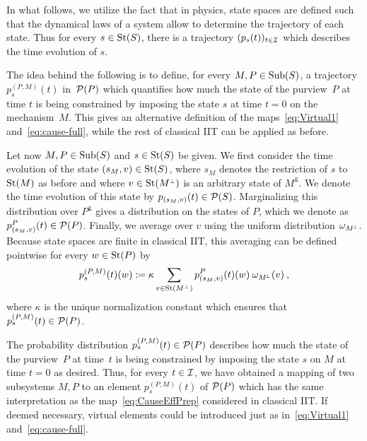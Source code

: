 In what follows, we utilize the fact that in physics, state spaces are defined such that the dynamical laws of a system allow to determine the trajectory of each state.
Thus for every $s \in \text{St}(S)$, there is a trajectory  $(p_s(t))_{t\in{\mathcal{I}}}$ which describes the time evolution of $s$.\medskip


The idea behind the following is to define, for every $M, P \in \mathrm{Sub}(S)$, a trajectory $p_{s}^{(P,M)}\!(t)$ in~$\mathcal P(P)$ which quantifies how much the state of the purview~$P$ at time $t$ is being constrained by imposing the state $s$ at time $t=0$ on the mechanism~$M$. 
This gives an alternative definition of the maps~\eqref{eq:Virtual1} and~\eqref{eq:cause-full}, while the rest of classical IIT can be applied as before.\medskip


Let now $M, P \in \mathrm{Sub}(S)$ and $s \in \text{St}(S)$ be given.
We first consider the time evolution of the state $(s_M, v) \in \text{St}(S)$, where $s_M$ denotes the restriction of $s$ to $\text{St}(M)$ as before and where $v \in \text{St}(M^{\scriptscriptstyle \bot})$ is an arbitrary state of $M^\Bot$. We denote the time evolution of this state by $p_{(s_M,v)}(t) \in \mathcal P(S)$.
Marginalizing this distribution over $P^\Bot$ gives a distribution on the states of $P$, which we denote as $ p_{(s_M,v)}^P(t) \in \mathcal P(P)$.
Finally, we average over $v$ using the uniform distribution ${\omega_{M^{\!\scriptscriptstyle \bot}}}$. Because state spaces are finite in classical IIT, this averaging can be defined pointwise for every $w \in \text{St}(P)$ by
\begin{equation}\label{eq:Average}
p_{s}^{(P,M)}(t)(w) := \kappa  \sum_{v \in \text{St}(M^{\scriptscriptstyle \bot})} p_{(s_M,v)}^P(t)(w) \: {\omega_{M^{\!\scriptscriptstyle \bot}}}(v) \: ,
\end{equation}
where $\kappa$ is the unique normalization constant which ensures that $p_{s}^{(P,M)}(t) \in \mathcal P(P)$.

The probability distribution $p_{s}^{(P,M)}(t) \in \mathcal P(P)$ describes how much the state of the purview~$P$ at time~$t$ is being constrained by imposing the state $s$ on $M$ at time $t=0$ as desired. Thus, for every $t \in {\mathcal{I}}$, we have obtained a mapping of two subsystems $M, P$ to an element $p_{s}^{(P,M)}(t)$ of $\mathcal P(P)$ which has the same interpretation as the map~\eqref{eq:CauseEffPrep} considered in classical IIT.
If deemed necessary, virtual elements could be introduced just as in~\eqref{eq:Virtual1} and~\eqref{eq:cause-full}.
\medskip
 	
